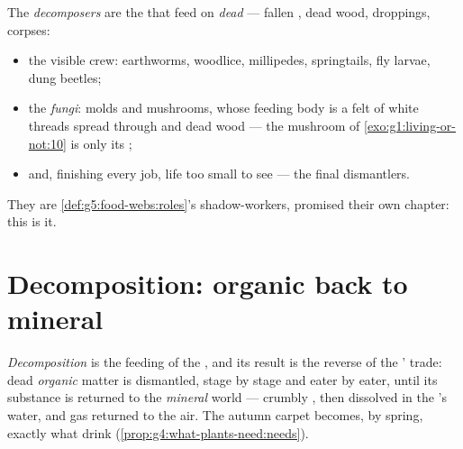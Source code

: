 \begin{definition}[Decomposers]\label{def:g6:decomposers-and-soil:decomposers}
The \emph{decomposers} are the  that feed on \emph{dead } --- fallen
, dead wood, droppings, corpses:
\begin{itemize}
  \item the visible crew: earthworms, woodlice, millipedes,
        springtails, fly larvae, dung beetles;
  \item the \emph{fungi}: molds and mushrooms,
        whose feeding body is a felt of white threads spread
        through  and dead wood --- the mushroom of
        \cref{exo:g1:living-or-not:10} is only its ;
  \item and, finishing every job,  life too small to
        see --- the final dismantlers.
\end{itemize}
They are \cref{def:g5:food-webs:roles}'s shadow-workers,
promised their own chapter: this is it.
\end{definition}

\section{Decomposition: organic back to mineral}

\begin{proposition}\label{prop:g6:decomposers-and-soil:decomposition}
\emph{Decomposition} is the feeding of
the , and its result is the reverse of the
' trade: dead \emph{organic} matter is dismantled,
stage by stage and eater by eater, until its substance is
returned to the \emph{mineral} world --- crumbly , then
dissolved  in the 's water, and gas
returned to the air. The autumn carpet becomes, by spring,
exactly what  drink
(\cref{prop:g4:what-plants-need:needs}).
\end{proposition}
\admitted

